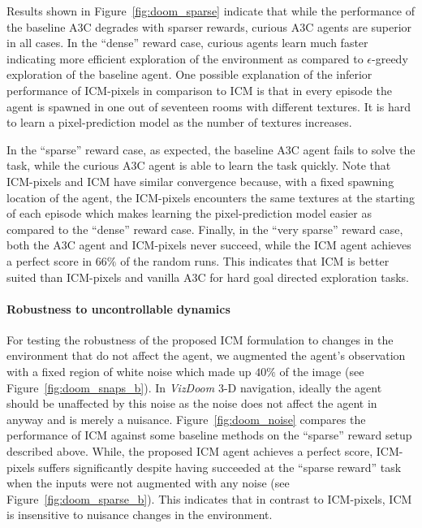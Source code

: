\documentclass{article}
\begin{document}
Results shown in Figure~\ref{fig:doom_sparse} indicate that while the performance of the baseline A3C degrades with sparser rewards, curious A3C agents are superior in all cases. In the ``dense'' reward case, curious agents learn much faster indicating more efficient exploration of the environment as compared to $\epsilon$-greedy exploration of the baseline agent. One possible explanation of the inferior performance of ICM-pixels in comparison to ICM is that in every episode the agent is spawned in one out of seventeen rooms with different textures. It is hard to learn a pixel-prediction model as the number of textures increases.

In the ``sparse'' reward case, as expected, the baseline A3C agent fails to solve the task, while the curious A3C agent is able to learn the task quickly. Note that ICM-pixels and ICM have similar convergence because, with a fixed spawning location of the agent, the ICM-pixels encounters the same textures at the starting of each episode which makes learning the pixel-prediction model easier as compared to the ``dense'' reward case. Finally, in the ``very sparse'' reward case, both the A3C agent and ICM-pixels never succeed, while the ICM agent achieves a perfect score in $66\%$ of the random runs. This indicates that ICM is better suited than ICM-pixels and vanilla A3C for hard goal directed exploration tasks.

\paragraph{Robustness to uncontrollable dynamics}
For testing the robustness of the proposed ICM formulation to changes in the environment that do not affect the agent, we augmented the agent's observation with a fixed region of white noise which made up $40\%$ of the image (see Figure~\ref{fig:doom_snaps_b}). In {\em VizDoom} 3-D navigation, ideally the agent should be unaffected by this noise as the noise does not affect the agent in anyway and is merely a nuisance. Figure~\ref{fig:doom_noise} compares the performance of ICM against some baseline methods on the ``sparse'' reward setup described above. While, the proposed ICM agent achieves a perfect score, ICM-pixels suffers significantly despite having succeeded at the ``sparse reward'' task when the inputs were not augmented with any noise (see Figure~\ref{fig:doom_sparse_b}). This indicates that in contrast to ICM-pixels, ICM is insensitive to nuisance changes in the environment.
\end{document}
